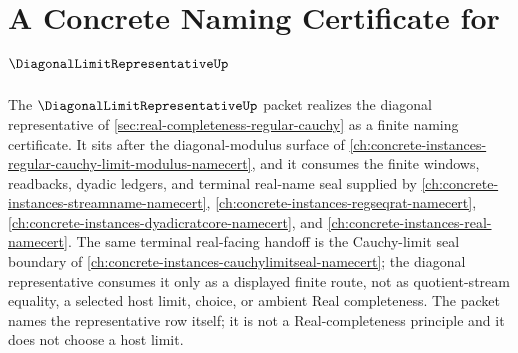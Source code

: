 \chapter{A Concrete Naming Certificate for $\DiagonalLimitRepresentativeUp$}
\label{ch:concrete-instances-diagonallimitrepresentative-namecert}

The $\DiagonalLimitRepresentativeUp$ packet realizes the diagonal representative of \autoref{sec:real-completeness-regular-cauchy} as a finite naming certificate. It sits after the diagonal-modulus surface of \autoref{ch:concrete-instances-regular-cauchy-limit-modulus-namecert}, and it consumes the finite windows, readbacks, dyadic ledgers, and terminal real-name seal supplied by \autoref{ch:concrete-instances-streamname-namecert}, \autoref{ch:concrete-instances-regseqrat-namecert}, \autoref{ch:concrete-instances-dyadicratcore-namecert}, and \autoref{ch:concrete-instances-real-namecert}. The same terminal real-facing handoff is the Cauchy-limit seal boundary of \autoref{ch:concrete-instances-cauchylimitseal-namecert}; the diagonal representative consumes it only as a displayed finite route, not as quotient-stream equality, a selected host limit, choice, or ambient Real completeness. The packet names the representative row itself; it is not a Real-completeness principle and it does not choose a host limit.

